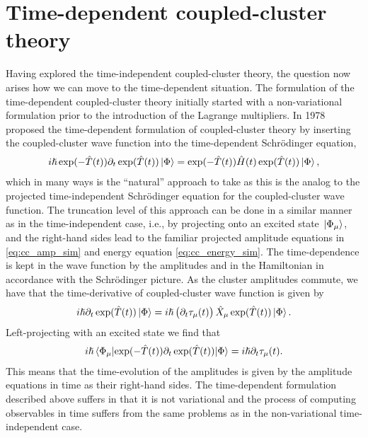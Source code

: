     \section{Time-dependent coupled-cluster theory}
        Having explored the time-independent coupled-cluster theory, the
        question now arises how we can move to the time-dependent situation.
        The formulation of the time-dependent coupled-cluster theory initially
        started with a non-variational formulation prior to the introduction of
        the Lagrange multipliers.
        In 1978 \citeauthor{tdcc-hoodbhoy} \cite{tdcc-hoodbhoy, tdcc-hoodbhoy-2}
        proposed the time-dependent formulation of coupled-cluster theory by
        inserting the coupled-cluster wave function into the time-dependent
        Schrödinger equation,
        \begin{align}
            i\hslash
            \exponential(-\clust(t))
            \partial_t
            \exponential(\clust(t))
            \ket{\slat}
            = \exponential(-\clust(t))
            \hamil(t)
            \exponential(\clust(t))
            \ket{\slat},
        \end{align}
        which in many ways is the ``natural'' approach to take as this is the
        analog to the projected time-independent Schrödinger equation for the
        coupled-cluster wave function.
        The truncation level of this approach can be done in a similar manner as
        in the time-independent case, i.e., by projecting onto an excited state
        $\ket*{\Phi_{\mu}}$, and the right-hand sides lead to the familiar
        projected amplitude equations in \autoref{eq:cc_amp_sim} and energy
        equation \autoref{eq:cc_energy_sim}.
        The time-dependence is kept in the wave function by the amplitudes and
        in the Hamiltonian in accordance with the Schrödinger picture.
        As the cluster amplitudes commute, we have that the time-derivative of
        coupled-cluster wave function is given by
        \begin{align}
            i\hslash\partial_t
            \exponential(\clust(t))
            \ket{\slat}
            = i\hslash \para{
                \partial_t\clustamp_{\mu}(t)
            }
            \hat{X}_{\mu}
            \exponential(\clust(t))
            \ket{\slat}.
        \end{align}
        Left-projecting with an excited state we find that
        \begin{align}
            i\hslash
            \mel*{\slat_{\mu}}{
                \exponential(-\clust(t))
                \partial_t
                \exponential(\clust(t))
            }{\slat}
            =
            i\hslash
            \partial_t
            \clustamp_{\mu}(t).
            \label{eq:td-clustamp}
        \end{align}
        This means that the time-evolution of the amplitudes is given by the
        amplitude equations in time as their right-hand sides.
        The time-dependent formulation described above suffers in that it is not
        variational \cite{tdcc-hoodbhoy, tdcc-hoodbhoy-2, tdcc-huber} and the
        process of computing observables in time suffers from the same problems
        as in the non-variational time-independent case.


